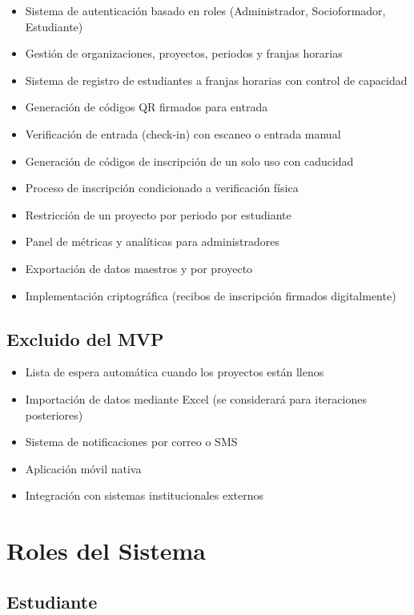 \documentclass[12pt,a4paper]{article}
\begin{document}
\begin{itemize}[leftmargin=*]
    \item Sistema de autenticación basado en roles (Administrador, Socioformador, Estudiante)
    \item Gestión de organizaciones, proyectos, periodos y franjas horarias
    \item Sistema de registro de estudiantes a franjas horarias con control de capacidad
    \item Generación de códigos QR firmados para entrada
    \item Verificación de entrada (check-in) con escaneo o entrada manual
    \item Generación de códigos de inscripción de un solo uso con caducidad
    \item Proceso de inscripción condicionado a verificación física
    \item Restricción de un proyecto por periodo por estudiante
    \item Panel de métricas y analíticas para administradores
    \item Exportación de datos maestros y por proyecto
    \item Implementación criptográfica (recibos de inscripción firmados digitalmente)
\end{itemize}

\subsection{Excluido del MVP}

\begin{itemize}[leftmargin=*]
    \item Lista de espera automática cuando los proyectos están llenos
    \item Importación de datos mediante Excel (se considerará para iteraciones posteriores)
    \item Sistema de notificaciones por correo o SMS
    \item Aplicación móvil nativa
    \item Integración con sistemas institucionales externos
\end{itemize}

\section{Roles del Sistema}

\subsection{Estudiante}
\end{document}
